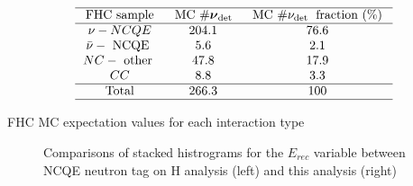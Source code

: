 \begin{table}
    $$
    \begin{array}{ccc}
    \hline \text { FHC sample } & \text { MC } \# \boldsymbol{\nu}_{\text {det }} & \text { MC } \# \nu_{\text {det }} \text { fraction (\%) } \\
    \hline \nu-N C Q E & 204.1 & 76.6 \\
    \bar{\nu}-\text { NCQE } & 5.6 & 2.1 \\
    N C-\text { other } & 47.8 & 17.9 \\
    C C & 8.8 & 3.3 \\
    \hline \text { Total } & 266.3 & 100 \\
    \hline
    \end{array}
    $$
    \caption{FHC MC expectation values for each interaction type}
    \label{table:nu_FHC_mc}
\end{table}


\begin{figure}[!htbp]
    \centering
    
    \caption{Comparisons of stacked histrograms for the $E_{rec}$ variable between NCQE neutron tag on H analysis (left) and this analysis (right)} \label{fig:erec_reduction} 
    
      \hfill 
     \par
    
        
\end{figure}

